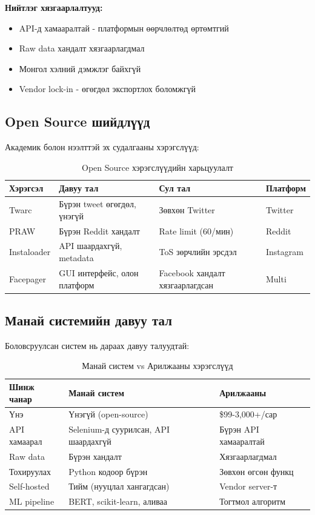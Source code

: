 \documentclass[12pt,a4paper]{report}
\begin{document}
\textbf{Нийтлэг хязгаарлалтууд:}
\begin{itemize}
    \item API-д хамааралтай - платформын өөрчлөлтөд өртөмтгий
    \item Raw data хандалт хязгаарлагдмал
    \item Монгол хэлний дэмжлэг байхгүй
    \item Vendor lock-in - өгөгдөл экспортлох боломжгүй
\end{itemize}

\subsection{Open Source шийдлүүд}

Академик болон нээлттэй эх судалгааны хэрэгслүүд:

\begin{table}[H]
\centering
\caption{Open Source хэрэгслүүдийн харьцуулалт}
\begin{tabular}{|p{2.5cm}|p{3.5cm}|p{3.5cm}|p{2.5cm}|}
\hline
\textbf{Хэрэгсэл} & \textbf{Давуу тал} & \textbf{Сул тал} & \textbf{Платформ} \\
\hline
Twarc & Бүрэн tweet өгөгдөл, үнэгүй & Зөвхөн Twitter & Twitter \\
\hline
PRAW & Бүрэн Reddit хандалт & Rate limit (60/мин) & Reddit \\
\hline
Instaloader & API шаардахгүй, metadata & ToS зөрчлийн эрсдэл & Instagram \\
\hline
Facepager & GUI интерфейс, олон платформ & Facebook хандалт хязгаарлагдсан & Multi \\
\hline
\end{tabular}
\end{table}

\subsection{Манай системийн давуу тал}

Боловсруулсан систем нь дараах давуу талуудтай:

\begin{table}[H]
\centering
\caption{Манай систем vs Арилжааны хэрэгслүүд}
\begin{tabular}{|p{3.5cm}|p{4cm}|p{4cm}|}
\hline
\textbf{Шинж чанар} & \textbf{Манай систем} & \textbf{Арилжааны} \\
\hline
Үнэ & Үнэгүй (open-source) & \$99-3,000+/сар \\
\hline
API хамаарал & Selenium-д суурилсан, API шаардахгүй & Бүрэн API хамааралтай \\
\hline
Raw data & Бүрэн хандалт & Хязгаарлагдмал \\
\hline
Тохируулах & Python кодоор бүрэн & Зөвхөн өгсөн функц \\
\hline
Self-hosted & Тийм (нууцлал хангагдсан) & Vendor server-т \\
\hline
ML pipeline & BERT, scikit-learn, аливаа & Тогтмол алгоритм \\
\hline
\end{tabular}
\end{table}
\end{document}
